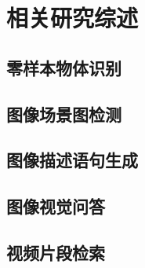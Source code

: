 \chapter{相关研究综述}

\section{零样本物体识别}

\section{图像场景图检测}

\section{图像描述语句生成}

\section{图像视觉问答}

\section{视频片段检索}